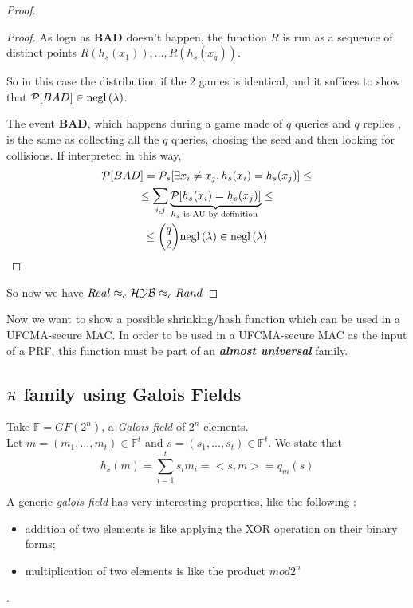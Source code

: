 \begin{proof}
\begin{proof}
    As logn as \textbf{BAD} doesn't happen, the function $R$ is run as a
    sequence of distinct points $R(h_{s}(x_{1})), ..., R(h_{s}(x_{q}))$.

    So in this case the distribution if the 2 games is identical, and it
    suffices to show that $ \mathcal{P} [ BAD ] \in \mathrm{negl}\left({\lambda}\right)  $.

    The event \textbf{BAD}, which happens during a game made of $q$ queries and
    $q$ replies ,  is the same as collecting all the $q$ queries, chosing the
    seed and then looking for collisions. If interpreted in this way, 
    \begin{gather*}
        \mathcal{P} [ BAD ] = \mathcal{P}_{s} [ \exists x_{i}\not=x_{j}, h_{s}(x_{i})=
        h_{s}(x_{j})] \leq \\
        \leq \sum_{i,j} \underbrace{\mathcal{P} [ h_{s}(x_{i})=h_{s}(x_{j})
        ]}_{h_{s}\text{ is AU by definition }} \leq \\
        \leq {q \choose 2} \mathrm{negl}\left({\lambda}\right) \in \mathrm{negl}\left({\lambda}\right)    
    \end{gather*}

\end{proof}

So now we have $Real \approx_{c} \mathcal{H}\mathcal{Y}\mathcal{B} \approx_{c} Rand$
 \end{proof}
    
 Now we want to show a possible shrinking/hash function which can be used in a
 UFCMA-secure MAC. In order to be used in a UFCMA-secure MAC as the input of a
 PRF, this function must be part of an \textbf{\textit{almost universal}} family.

 \subsection{$\mathcal{H}$ family using Galois Fields}
 \begin{construction}
     Take $ \mathbb{F}=GF(2^{n})$, a \textit{Galois field} of $2^{n}$
     elements.\\
     Let $m=(m_{1}, ..., m_{t}) \in \mathbb{F}^{t} $ and $s=(s_{1}, ...,
     s_{t}) \in \mathbb{F}^{t} $. We state that 
     \[
         h_{s}(m)= \sum_{i=1}^{t}s_{i}m_{i}=<s,m>=q_{m}(s)
        \]
 \end{construction}

 A generic \textit{galois field} has very interesting properties, like the
 following :
 \begin{itemize}
     \item addition of two elements is like applying the XOR operation on their
         binary forms;
     \item multiplication of two elements is like the product $mod 2^{n}$
 \end{itemize}.


